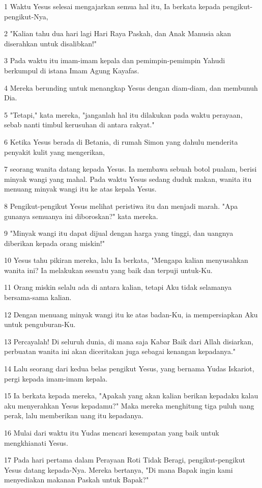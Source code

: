 \par 1 Waktu Yesus selesai mengajarkan semua hal itu, Ia berkata kepada pengikut-pengikut-Nya,
\par 2 "Kalian tahu dua hari lagi Hari Raya Paskah, dan Anak Manusia akan diserahkan untuk disalibkan!"
\par 3 Pada waktu itu imam-imam kepala dan pemimpin-pemimpin Yahudi berkumpul di istana Imam Agung Kayafas.
\par 4 Mereka berunding untuk menangkap Yesus dengan diam-diam, dan membunuh Dia.
\par 5 "Tetapi," kata mereka, "janganlah hal itu dilakukan pada waktu perayaan, sebab nanti timbul kerusuhan di antara rakyat."
\par 6 Ketika Yesus berada di Betania, di rumah Simon yang dahulu menderita penyakit kulit yang mengerikan,
\par 7 seorang wanita datang kepada Yesus. Ia membawa sebuah botol pualam, berisi minyak wangi yang mahal. Pada waktu Yesus sedang duduk makan, wanita itu menuang minyak wangi itu ke atas kepala Yesus.
\par 8 Pengikut-pengikut Yesus melihat peristiwa itu dan menjadi marah. "Apa gunanya semuanya ini diboroskan?" kata mereka.
\par 9 "Minyak wangi itu dapat dijual dengan harga yang tinggi, dan uangnya diberikan kepada orang miskin!"
\par 10 Yesus tahu pikiran mereka, lalu Ia berkata, "Mengapa kalian menyusahkan wanita ini? Ia melakukan sesuatu yang baik dan terpuji untuk-Ku.
\par 11 Orang miskin selalu ada di antara kalian, tetapi Aku tidak selamanya bersama-sama kalian.
\par 12 Dengan menuang minyak wangi itu ke atas badan-Ku, ia mempersiapkan Aku untuk penguburan-Ku.
\par 13 Percayalah! Di seluruh dunia, di mana saja Kabar Baik dari Allah disiarkan, perbuatan wanita ini akan diceritakan juga sebagai kenangan kepadanya."
\par 14 Lalu seorang dari kedua belas pengikut Yesus, yang bernama Yudas Iskariot, pergi kepada imam-imam kepala.
\par 15 Ia berkata kepada mereka, "Apakah yang akan kalian berikan kepadaku kalau aku menyerahkan Yesus kepadamu?" Maka mereka menghitung tiga puluh uang perak, lalu memberikan uang itu kepadanya.
\par 16 Mulai dari waktu itu Yudas mencari kesempatan yang baik untuk mengkhianati Yesus.
\par 17 Pada hari pertama dalam Perayaan Roti Tidak Beragi, pengikut-pengikut Yesus datang kepada-Nya. Mereka bertanya, "Di mana Bapak ingin kami menyediakan makanan Paskah untuk Bapak?"
